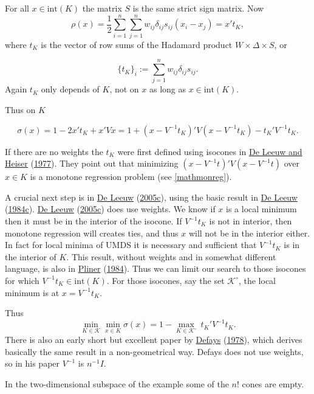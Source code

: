 \documentclass[
  12pt,
]{book}
\theoremstyle{definition}
\theoremstyle{definition}
\theoremstyle{definition}
\theoremstyle{definition}
\theoremstyle{remark}
\begin{document}
For all \(x\in\text{int}(K)\) the matrix \(S\) is the same strict sign matrix. Now
\[
\rho(x)=\frac12\sum_{i=1}^n\sum_{j=1}^nw_{ij}\delta_{ij}s_{ij}(x_i-x_j)=x't_K,
\]
where \(t_K\) is the vector of row sums of the Hadamard product \(W\times\Delta\times S\), or

\[
\{t_K\}_i:=\sum_{j=1}^nw_{ij}\delta_{ij}s_{ij}.
\]
Again \(t_K\) only depends of \(K\), not on \(x\) as long as \(x\in\text{int}(K)\).

Thus on \(K\)

\[
\sigma(x)=1-2x't_K+x'Vx=1+(x-V^{-1}t_K)'V(x-V^{-1}t_K)-t_K'V^{-1}t_K^{\ }.
\]

If there are no weights the \(t_K\) were first defined using isocones in \protect\hyperlink{ref-deleeuw_heiser_C_77}{De Leeuw and Heiser} (\protect\hyperlink{ref-deleeuw_heiser_C_77}{1977}). They point out that minimizing \((x-V^{-1}t)'V(x-V^{-1}t)\) over \(x\in K\) is a monotone regression problem (see \ref{mathmonreg}).

A crucial next step is in \protect\hyperlink{ref-deleeuw_C_05h}{De Leeuw} (\protect\hyperlink{ref-deleeuw_C_05h}{2005c}), using the basic result in \protect\hyperlink{ref-deleeuw_A_84f}{De Leeuw} (\protect\hyperlink{ref-deleeuw_A_84f}{1984c}). \protect\hyperlink{ref-deleeuw_C_05h}{De Leeuw} (\protect\hyperlink{ref-deleeuw_C_05h}{2005c}) does use weights. We know if \(x\) is a local minimum then it must be in the interior of the isocone. If \(V^{-1}t_K\) is not in interior, then monotone regression will creates ties, and thus \(x\) will not be in the interior either. In fact for local minima of UMDS it is necessary and sufficient that \(V^{-1}t_K\) is in the interior of \(K\). This result, without weights and in somewhat different language, is also in \protect\hyperlink{ref-pliner_84}{Pliner} (\protect\hyperlink{ref-pliner_84}{1984}). Thus we can limit our search to those isocones for which \(V^{-1}t_K\in\text{int}(K)\). For those isocones, say the set \(\mathcal{K}^\circ\), the local minimum is at \(x=V^{-1}t_K\).

Thus
\[
\min_{K\in\mathcal{K}}\min_{x\in K}\sigma(x)=1 -\max_{K\in\mathcal{K}^\circ}\ t_K'V^{-1}t_K^{\ }.
\]
There is also an early short but excellent paper by \protect\hyperlink{ref-defays_78}{Defays} (\protect\hyperlink{ref-defays_78}{1978}), which derives basically the same result in a non-geometrical way. Defays does not use weights, so in his paper \(V^{-1}\) is \(n^{-1}I\).

In the two-dimensional subspace of the example some of the \(n!\) cones are empty.
\end{document}
